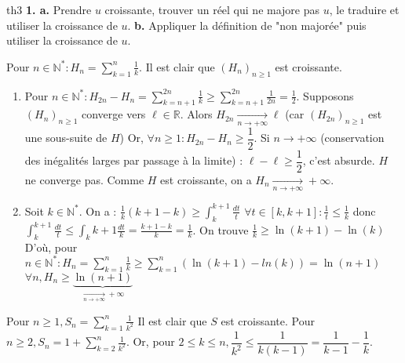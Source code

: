 \documentclass[12pt,a4paper]{report}
\begin{document}
\begin{principedemo}{th3}
\textbf{1. a.} Prendre $u$ croissante, trouver un réel qui ne majore pas $u$, le traduire et utiliser la croissance de $u$.
\newline \textbf{b.} Appliquer la définition de "non majorée" puis utiliser la croissance de $u$.
\end{principedemo}


\begin{exemple}
 Pour $n \in \mathbb{N}^* : H_n = \sum_{k=1}^n \frac{1}{k}$. Il est clair que $(H_n)_{n \geq 1}$ est croissante.
\begin{enumerate}
\item Pour $n \in \mathbb{N}^* : H_{2n}-H_n = \sum_{k=n+1}^{2n} \frac{1}{k} \geq \sum_{k=n+1}^{2n} \frac{1}{2n} = \frac{1}{2}$.
\newline Supposons $(H_n)_{n\geq 1}$ converge vers $\ell \in \mathbb{R}$. Alors $H_{2n} \xrightarrow[n \rightarrow +\infty]{} \ell$ (car $(H_{2n})_{n \geq 1}$ est une sous-suite de $H$)
\newline Or, $\forall n \geq 1 : H_{2n}-H_n \geq \dfrac{1}{2}$.
\newline Si $n \rightarrow +\infty$ (conservation des inégalités larges par passage à la limite) : $\ell-\ell \geq \dfrac{1}{2}$, c'est absurde.
\newline $H$ ne converge pas. Comme $H$ est croissante, on a $H_n \xrightarrow[n \rightarrow +\infty]{} +\infty$.
\item Soit $k \in \mathbb{N}^*$.
\newline On a : $\frac{1}{k}(k+1-k) \geq \int_{k}^{k+1}\frac{dt}{t}$
\newline $\forall t \in \left[k,k+1\right] : \frac{1}{t} \leq \frac{1}{k}$ donc $\int_{k}^{k+1} \frac{dt}{t} \leq \int_{k}{k+1}\frac{dt}{k} = \frac{k+1-k}{k} = \frac{1}{k}$.
\newline On trouve $\frac{1}{k} \geq \ln(k+1)-\ln(k)$
\newline D'où, pour $n \in \mathbb{N}^* : H_n = \sum_{k=1}^{n} \frac{1}{k} \geq \sum_{k=1}^{n} \left(\ln(k+1)-ln(k)\right) = \ln(n+1)$
\newline $\forall n, H_n \geq \underbrace{\ln (n+1)}_{\xrightarrow[n \rightarrow +\infty]{}+\infty}$
\end{enumerate}
Pour $n\geq 1, S_n = \sum_{k=1}^{n}\frac{1}{k^2}$
\newline Il est clair que $S$ est croissante. 
\newline Pour $n \geq 2, S_n = 1 + \sum_{k=2}^{n} \frac{1}{k^2}$. Or, pour $2 \leq k \leq n, \dfrac{1}{k^2} \leq \dfrac{1}{k(k-1)} = \dfrac{1}{k-1}-\dfrac{1}{k}$.

\end{exemple}
\end{document}
